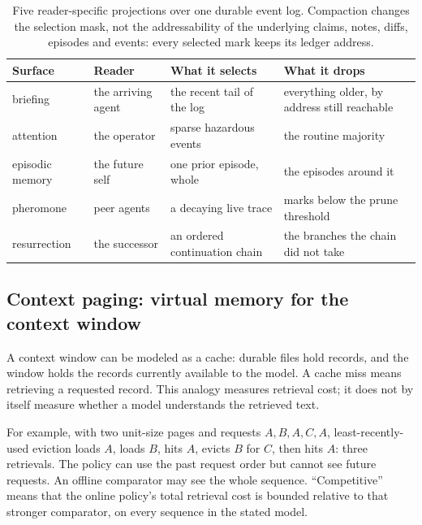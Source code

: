 \documentclass[11pt,a4paper]{article}
\theoremstyle{definition}
\theoremstyle{plain}
\begin{document}
%
\begin{table}[tp]
\centering
\caption{Five reader-specific projections over one durable event log. Compaction changes the selection mask, not the addressability of the underlying claims, notes, diffs, episodes and events: every selected mark keeps its ledger address.}
\label{tab:ls-read-surfaces}
\small
\renewcommand{\arraystretch}{1.15}
\begin{tabularx}{\linewidth}{@{}l l >{\raggedright\arraybackslash}X >{\raggedright\arraybackslash}X@{}}
\toprule
\textbf{Surface} & \textbf{Reader} & \textbf{What it selects} & \textbf{What it drops} \\
\midrule
briefing & the arriving agent & the recent tail of the log & everything older, by address still reachable \\
attention & the operator & sparse hazardous events & the routine majority \\
episodic memory & the future self & one prior episode, whole & the episodes around it \\
pheromone & peer agents & a decaying live trace & marks below the prune threshold \\
resurrection & the successor & an ordered continuation chain & the branches the chain did not take \\
\bottomrule
\end{tabularx}
\end{table}

\subsection{Context paging: virtual memory for the context window}\label{sec:context-paging}

A context window can be modeled as a cache: durable files hold records, and the window holds the records currently available to the model. A cache miss means retrieving a requested record. This analogy measures retrieval cost; it does not by itself measure whether a model understands the retrieved text.

For example, with two unit-size pages and requests $A,B,A,C,A$, least-recently-used eviction loads $A$, loads $B$, hits $A$, evicts $B$ for $C$, then hits $A$: three retrievals. The policy can use the past request order but cannot see future requests. An offline comparator may see the whole sequence. ``Competitive'' means that the online policy's total retrieval cost is bounded relative to that stronger comparator, on every sequence in the stated model.
\end{document}
